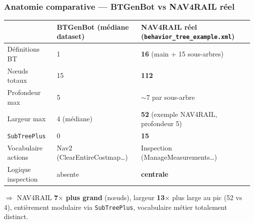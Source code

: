 \documentclass[aspectratio=169]{beamer}
\begin{document}
\begin{frame}
  \frametitle{Anatomie comparative --- BTGenBot vs NAV4RAIL réel}

  \vspace{0.2em}
  \begin{center}
  {\scriptsize\begin{tabular}{p{2.8cm}p{4.3cm}p{4.3cm}}
    \toprule
    & \textbf{BTGenBot} (médiane dataset) & \textbf{NAV4RAIL réel} (\texttt{behavior\_tree\_example.xml}) \\
    \midrule
    Définitions BT        & 1                              & \textbf{16} (main + 15 sous-arbres) \\
    Nœuds totaux          & 15                             & \textbf{112} \\
    Profondeur max        & 5                              & $\sim$7 par sous-arbre \\
    Largeur max           & 4 (médiane)                    & \textbf{52} (exemple NAV4RAIL, profondeur 5) \\
    \texttt{SubTreePlus}  & 0                              & \textbf{15} \\
    Vocabulaire actions   & Nav2 (ClearEntireCostmap…)     & Inspection (ManageMeasurements…) \\
    Logique inspection    & absente                        & \textbf{centrale} \\
    \bottomrule
  \end{tabular}}
  \end{center}

  \vspace{0.3em}
  \begin{center}
  {\scriptsize $\Rightarrow$ NAV4RAIL \textbf{7$\times$ plus grand} (nœuds), largeur \textbf{13$\times$} plus large au pic (52 vs 4), entièrement modulaire via \texttt{SubTreePlus}, vocabulaire métier totalement distinct.}
  \end{center}
\end{frame}
\end{document}
